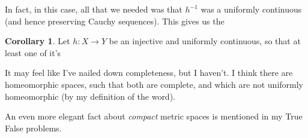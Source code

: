 \documentclass[11pt]{article}
\newcommand{\inv}[1]{{#1}^{-1}}
\theoremstyle{definition}
\newtheorem{corollary}{Corollary}
\begin{document}
In fact, in this case, all that we needed was that $\inv{h}$ was a uniformly continuous (and hence preserving Cauchy sequences). This gives us the

\begin{corollary}
Let $h:X\to Y$ be an injective and uniformly continuous, so that at least one of it's 
\end{corollary}

It may feel like I've nailed down completeness, but I haven't. I think there are homeomorphic spaces, such that both are complete, and which are not uniformly homeomorphic (by my definition of the word). 

An even more elegant fact about \textit{compact} metric spaces is mentioned in my True False problems.
\end{document}
